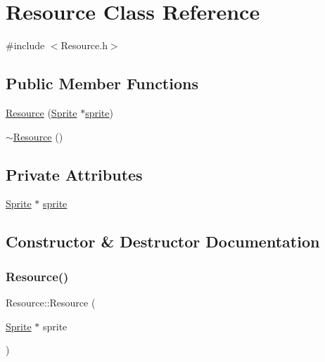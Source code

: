 \hypertarget{class_resource}{}\section{Resource Class Reference}
\label{class_resource}


{\ttfamily \#include $<$Resource.\+h$>$}

\subsection*{Public Member Functions}
\begin{DoxyCompactItemize}
\item 
\hyperlink{class_resource_a213d48c11908f21c5c3c43c3682af09f}{Resource} (\hyperlink{class_sprite}{Sprite} $\ast$\hyperlink{class_resource_a786b65335656d3d4e9bebe44a6eeed5e}{sprite})
\item 
\hyperlink{class_resource_a0e5ec475e2601bdb33644468e86f6f10}{$\sim$\+Resource} ()
\end{DoxyCompactItemize}
\subsection*{Private Attributes}
\begin{DoxyCompactItemize}
\item 
\hyperlink{class_sprite}{Sprite} $\ast$ \hyperlink{class_resource_a786b65335656d3d4e9bebe44a6eeed5e}{sprite}
\end{DoxyCompactItemize}


\subsection{Constructor \& Destructor Documentation}
\mbox{\label{class_resource_a213d48c11908f21c5c3c43c3682af09f}} 
\subsubsection{\texorpdfstring{Resource()}{Resource()}}
{\footnotesize\ttfamily Resource\+::\+Resource (\begin{DoxyParamCaption}\item[{\hyperlink{class_sprite}{Sprite} $\ast$}]{sprite }\end{DoxyParamCaption})}

\mbox{\label{class_resource_a0e5ec475e2601bdb33644468e86f6f10}} 
